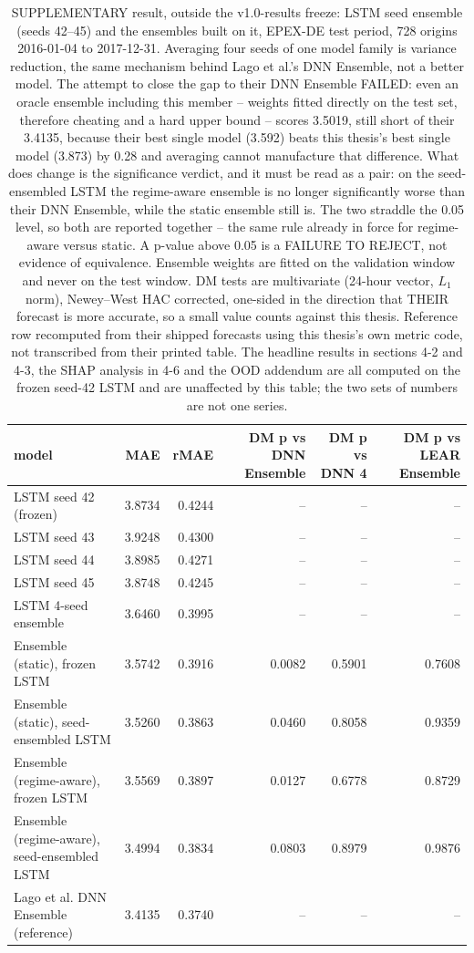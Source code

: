 \begin{table}[htbp]
\caption{SUPPLEMENTARY result, outside the v1.0-results freeze: LSTM seed ensemble (seeds 42--45) and the ensembles built on it, EPEX-DE test period, 728 origins 2016-01-04 to 2017-12-31. Averaging four seeds of one model family is variance reduction, the same mechanism behind Lago et al.'s DNN Ensemble, not a better model. The attempt to close the gap to their DNN Ensemble FAILED: even an oracle ensemble including this member -- weights fitted directly on the test set, therefore cheating and a hard upper bound -- scores 3.5019, still short of their 3.4135, because their best single model (3.592) beats this thesis's best single model (3.873) by 0.28 and averaging cannot manufacture that difference. What does change is the significance verdict, and it must be read as a pair: on the seed-ensembled LSTM the regime-aware ensemble is no longer significantly worse than their DNN Ensemble, while the static ensemble still is. The two straddle the 0.05 level, so both are reported together -- the same rule already in force for regime-aware versus static. A p-value above 0.05 is a FAILURE TO REJECT, not evidence of equivalence. Ensemble weights are fitted on the validation window and never on the test window. DM tests are multivariate (24-hour vector, $L_1$ norm), Newey--West HAC corrected, one-sided in the direction that THEIR forecast is more accurate, so a small value counts against this thesis. Reference row recomputed from their shipped forecasts using this thesis's own metric code, not transcribed from their printed table. The headline results in sections 4-2 and 4-3, the SHAP analysis in 4-6 and the OOD addendum are all computed on the frozen seed-42 LSTM and are unaffected by this table; the two sets of numbers are not one series.}
\label{tab:seed-ensemble}
\begin{tabular}{lrrrrr}
\toprule
model & MAE & rMAE & DM p vs DNN Ensemble & DM p vs DNN 4 & DM p vs LEAR Ensemble \\
\midrule
LSTM seed 42 (frozen) & 3.8734 & 0.4244 & -- & -- & -- \\
LSTM seed 43 & 3.9248 & 0.4300 & -- & -- & -- \\
LSTM seed 44 & 3.8985 & 0.4271 & -- & -- & -- \\
LSTM seed 45 & 3.8748 & 0.4245 & -- & -- & -- \\
LSTM 4-seed ensemble & 3.6460 & 0.3995 & -- & -- & -- \\
Ensemble (static), frozen LSTM & 3.5742 & 0.3916 & 0.0082 & 0.5901 & 0.7608 \\
Ensemble (static), seed-ensembled LSTM & 3.5260 & 0.3863 & 0.0460 & 0.8058 & 0.9359 \\
Ensemble (regime-aware), frozen LSTM & 3.5569 & 0.3897 & 0.0127 & 0.6778 & 0.8729 \\
Ensemble (regime-aware), seed-ensembled LSTM & 3.4994 & 0.3834 & 0.0803 & 0.8979 & 0.9876 \\
Lago et al. DNN Ensemble (reference) & 3.4135 & 0.3740 & -- & -- & -- \\
\bottomrule
\end{tabular}
\end{table}
